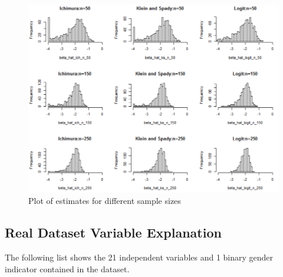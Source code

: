 \documentclass[a4paper]{article}
\begin{document}
\begin{figure}[h!]
  \includegraphics[width=\linewidth]{sample_size.png}
 
  \label{fig:comparison of estimates on the same scale}
    \caption{Plot of estimates for different sample sizes}

\end{figure}

\subsection{Real Dataset Variable Explanation}
The following list shows the 21 independent variables and 1 binary gender indicator contained in the dataset.
\end{document}
